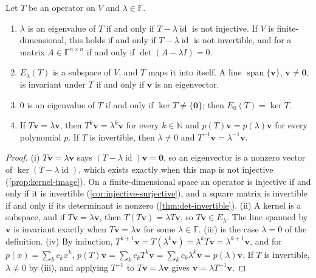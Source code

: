 \begin{proposition}
\label{prop:eigen-basic}
Let $T$ be an operator on $V$ and $\lambda\in\mathbb F$.
\begin{enumerate}
\item $\lambda$ is an eigenvalue of $T$ if and only if $T-\lambda\operatorname{id}$ is not injective. If $V$ is finite-dimensional, this holds if and only if $T-\lambda\operatorname{id}$ is not invertible, and for a matrix $A\in\mathbb F^{n\times n}$ if and only if $\det(A-\lambda I)=0$.
\item $E_\lambda(T)$ is a subspace of $V$, and $T$ maps it into itself. A line $\operatorname{span}\{\mathbf v\}$, $\mathbf v\ne\mathbf 0$, is invariant under $T$ if and only if $\mathbf v$ is an eigenvector.
\item $0$ is an eigenvalue of $T$ if and only if $\ker T\ne\{\mathbf 0\}$; then $E_0(T)=\ker T$.
\item If $T\mathbf v=\lambda\mathbf v$, then $T^k\mathbf v=\lambda^k\mathbf v$ for every $k\in\mathbb N$ and $p(T)\mathbf v=p(\lambda)\mathbf v$ for every polynomial $p$. If $T$ is invertible, then $\lambda\ne0$ and $T^{-1}\mathbf v=\lambda^{-1}\mathbf v$.
\end{enumerate}
\end{proposition}

\begin{proof}
(i) $T\mathbf v=\lambda\mathbf v$ says $(T-\lambda\operatorname{id})\mathbf v=\mathbf 0$, so an eigenvector is a nonzero vector of $\ker(T-\lambda\operatorname{id})$, which exists exactly when this map is not injective (\cref{prop:kernel-image}). On a finite-dimensional space an operator is injective if and only if it is invertible (\cref{cor:injective-surjective}), and a square matrix is invertible if and only if its determinant is nonzero (\cref{thm:det-invertible}). (ii) A kernel is a subspace, and if $T\mathbf v=\lambda\mathbf v$, then $T(T\mathbf v)=\lambda T\mathbf v$, so $T\mathbf v\in E_\lambda$. The line spanned by $\mathbf v$ is invariant exactly when $T\mathbf v=\lambda\mathbf v$ for some $\lambda\in\mathbb F$. (iii) is the case $\lambda=0$ of the definition. (iv) By induction, $T^{k+1}\mathbf v=T(\lambda^k\mathbf v)=\lambda^kT\mathbf v=\lambda^{k+1}\mathbf v$, and for $p(x)=\sum_kc_kx^k$, $p(T)\mathbf v=\sum_kc_kT^k\mathbf v=\sum_kc_k\lambda^k\mathbf v=p(\lambda)\mathbf v$. If $T$ is invertible, $\lambda\ne0$ by (iii), and applying $T^{-1}$ to $T\mathbf v=\lambda\mathbf v$ gives $\mathbf v=\lambda T^{-1}\mathbf v$.
\end{proof}

